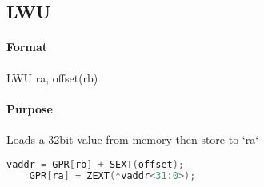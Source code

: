 \subsection{LWU}


\paragraph{Format} LWU ra, offset(rb)

\paragraph{Purpose} Loads a 32bit value from memory then store to `ra`

\begin{lstlisting}[language=C]
    vaddr = GPR[rb] + SEXT(offset);
    GPR[ra] = ZEXT(*vaddr<31:0>);
\end{lstlisting}
